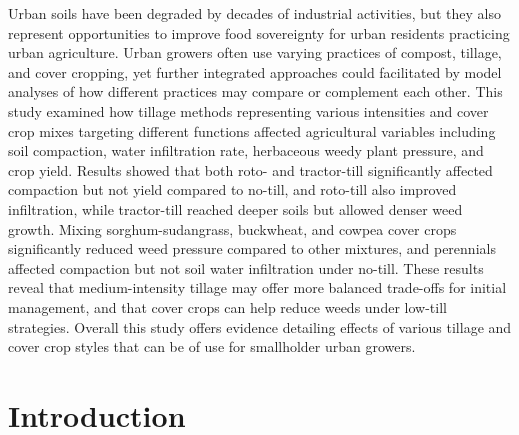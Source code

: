 \documentclass[
  12pt,
]{article}
\begin{document}
Urban soils have been degraded by decades of industrial activities, but they also represent opportunities to improve food sovereignty for urban residents practicing urban agriculture.
Urban growers often use varying practices of compost, tillage, and cover cropping, yet further integrated approaches could facilitated by model analyses of how different practices may compare or complement each other.
This study examined how tillage methods representing various intensities and cover crop mixes targeting different functions affected agricultural variables including soil compaction, water infiltration rate, herbaceous weedy plant pressure, and crop yield.
Results showed that both roto- and tractor-till significantly affected compaction but not yield compared to no-till, and roto-till also improved infiltration, while tractor-till reached deeper soils but allowed denser weed growth.
Mixing sorghum-sudangrass, buckwheat, and cowpea cover crops significantly reduced weed pressure compared to other mixtures, and perennials affected compaction but not soil water infiltration under no-till.
These results reveal that medium-intensity tillage may offer more balanced trade-offs for initial management, and that cover crops can help reduce weeds under low-till strategies.
Overall this study offers evidence detailing effects of various tillage and cover crop styles that can be of use for smallholder urban growers.

\newpage

\hypertarget{introduction}{%
\section{Introduction}\label{introduction}}
\end{document}
